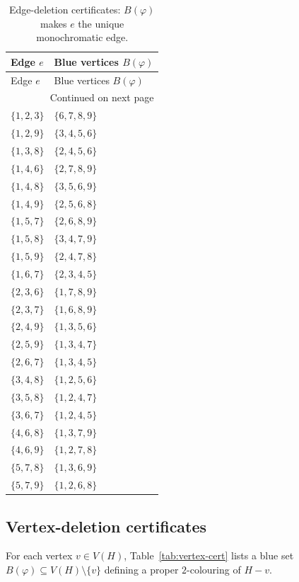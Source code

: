 \documentclass[11pt]{amsart}
\theoremstyle{definition}
\theoremstyle{remark}
\newcommand{\V}{V}
\begin{document}
\begin{longtable}{@{}ll@{}}
\caption{Edge-deletion certificates: $B(\varphi)$ makes $e$ the unique monochromatic edge.}\label{tab:edge-cert}\\
\toprule
Edge $e$ & Blue vertices $B(\varphi)$\\
\midrule
\endfirsthead
\toprule
Edge $e$ & Blue vertices $B(\varphi)$\\
\midrule
\endhead
\midrule
\multicolumn{2}{r}{\small Continued on next page}\\
\endfoot
\bottomrule
\endlastfoot
$\{1,2,3\}$ & $\{6,7,8,9\}$ \\
$\{1,2,9\}$ & $\{3,4,5,6\}$ \\
$\{1,3,8\}$ & $\{2,4,5,6\}$ \\
$\{1,4,6\}$ & $\{2,7,8,9\}$ \\
$\{1,4,8\}$ & $\{3,5,6,9\}$ \\
$\{1,4,9\}$ & $\{2,5,6,8\}$ \\
$\{1,5,7\}$ & $\{2,6,8,9\}$ \\
$\{1,5,8\}$ & $\{3,4,7,9\}$ \\
$\{1,5,9\}$ & $\{2,4,7,8\}$ \\
$\{1,6,7\}$ & $\{2,3,4,5\}$ \\
$\{2,3,6\}$ & $\{1,7,8,9\}$ \\
$\{2,3,7\}$ & $\{1,6,8,9\}$ \\
$\{2,4,9\}$ & $\{1,3,5,6\}$ \\
$\{2,5,9\}$ & $\{1,3,4,7\}$ \\
$\{2,6,7\}$ & $\{1,3,4,5\}$ \\
$\{3,4,8\}$ & $\{1,2,5,6\}$ \\
$\{3,5,8\}$ & $\{1,2,4,7\}$ \\
$\{3,6,7\}$ & $\{1,2,4,5\}$ \\
$\{4,6,8\}$ & $\{1,3,7,9\}$ \\
$\{4,6,9\}$ & $\{1,2,7,8\}$ \\
$\{5,7,8\}$ & $\{1,3,6,9\}$ \\
$\{5,7,9\}$ & $\{1,2,6,8\}$ \\
\end{longtable}

\subsection{Vertex-deletion certificates}

For each vertex $v\in \V(H)$, Table~\ref{tab:vertex-cert} lists a blue set $B(\varphi)\subseteq \V(H)\setminus\{v\}$ defining a proper $2$-colouring of $H-v$.
\end{document}
